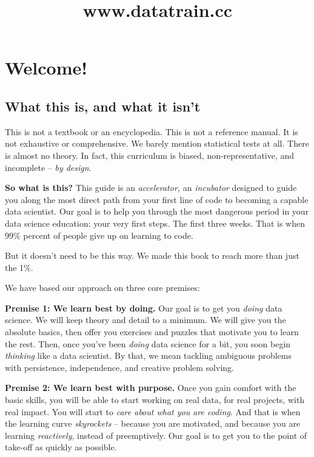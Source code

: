 \documentclass[
]{book}
\title{www.datatrain.cc}
\author{}
\date{\vspace{-2.5em}}
\begin{document}
\maketitle

{
\setcounter{tocdepth}{1}
\tableofcontents
}
\hypertarget{welcome}{%
\chapter{Welcome!}\label{welcome}}

\hypertarget{what-this-is-and-what-it-isnt}{%
\section*{What this is, and what it isn't}\label{what-this-is-and-what-it-isnt}}

This is not a textbook or an encyclopedia. This is not a reference manual. It is not exhaustive or comprehensive. We barely mention statistical tests at all. There is almost no theory. In fact, this curriculum is biased, non-representative, and incomplete -- \emph{by design.}

\textbf{So what is this?} This guide is an \emph{accelerator,} an \emph{incubator} designed to guide you along the most direct path from your first line of code to becoming a capable data scientist. Our goal is to help you through the most dangerous period in your data science education: your very first steps. The first three weeks. That is when 99\% percent of people give up on learning to code.

But it doesn't need to be this way. We made this book to reach more than just the 1\%.

We have based our approach on three core premises:

\textbf{Premise 1: We learn best by doing.} Our goal is to get you \emph{doing} data science. We will keep theory and detail to a minimum. We will give you the absolute basics, then offer you exercises and puzzles that motivate you to learn the rest. Then, once you've been \emph{doing} data science for a bit, you soon begin \emph{thinking} like a data scientist. By that, we mean tackling ambiguous problems with persistence, independence, and creative problem solving.

\textbf{Premise 2: We learn best with purpose.} Once you gain comfort with the basic skills, you will be able to start working on real data, for real projects, with real impact. You will start to \emph{care about what you are coding}. And that is when the learning curve \emph{skyrockets} -- because you are motivated, and because you are learning \emph{reactively}, instead of preemptively. Our goal is to get you to the point of take-off as quickly as possible.
\end{document}
